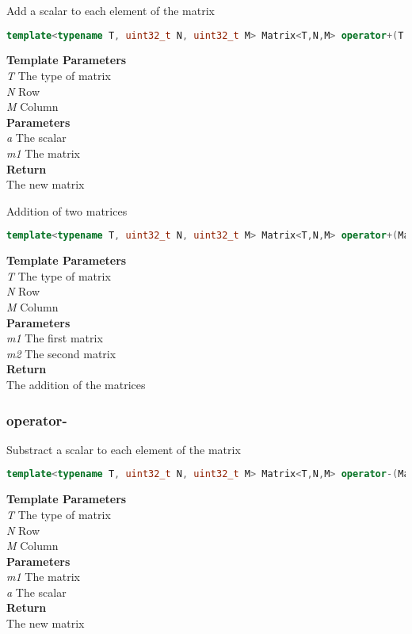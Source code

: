 \begin{mdframed}
Add a scalar to each element of the matrix
\begin{lstlisting}[language=C++]
template<typename T, uint32_t N, uint32_t M> Matrix<T,N,M> operator+(T a, Matrix<T,N,M> m1) 
\end{lstlisting}
\textbf{Template Parameters} \\ 
\textit{T} The type of matrix \\ 
\textit{N} Row \\ 
\textit{M} Column \\ 
\textbf{Parameters} \\ 
\textit{a} The scalar \\ 
\textit{m1} The matrix \\ 
\textbf{Return} \\ 
The new matrix\\ 
\end{mdframed}

\begin{mdframed}
Addition of two matrices
\begin{lstlisting}[language=C++]
template<typename T, uint32_t N, uint32_t M> Matrix<T,N,M> operator+(Matrix<T,N,M> m1, const Matrix<T,N,M>& m2) 
\end{lstlisting}
\textbf{Template Parameters} \\ 
\textit{T} The type of matrix \\ 
\textit{N} Row \\ 
\textit{M} Column \\ 
\textbf{Parameters} \\ 
\textit{m1} The first matrix \\ 
\textit{m2} The second matrix \\ 
\textbf{Return} \\ 
The addition of the matrices\\ 
\end{mdframed}

\subsubsection{operator-}
\begin{mdframed}
Substract a scalar to each element of the matrix
\begin{lstlisting}[language=C++]
template<typename T, uint32_t N, uint32_t M> Matrix<T,N,M> operator-(Matrix<T,N,M> m1, T a) 
\end{lstlisting}
\textbf{Template Parameters} \\ 
\textit{T} The type of matrix \\ 
\textit{N} Row \\ 
\textit{M} Column \\ 
\textbf{Parameters} \\ 
\textit{m1} The matrix \\ 
\textit{a} The scalar \\ 
\textbf{Return} \\ 
The new matrix\\ 
\end{mdframed}

